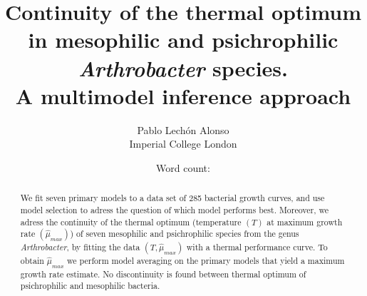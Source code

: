 \documentclass[titlepage,11pt]{article}
\newcommand{\wordcount}{} %
\begin{document}
	\title{\textbf{Continuity of the thermal optimum in mesophilic and psichrophilic \textit{Arthrobacter} species.\\
		 A multimodel inference approach} }
	\author{Pablo Lechón Alonso \\ [30pt]
				Imperial College London}
	\date{Word count: \wordcount}%
	\maketitle
	

	\begin{abstract}
		We fit seven primary models to a data set of 285 bacterial growth curves, and use model selection to adress the question of which model performs best. Moreover, we adress the continuity of the thermal optimum (temperature $ (T) $ at maximum growth rate $ (\hat{\mu}_{max} )$) of seven mesophilic and psichrophilic species from the genus \textit{Arthrobacter}, by fitting the data $ (T, \hat{\mu}_{max}) $ with a thermal performance curve. To obtain $\hat{\mu}_{max}$ we perform model averaging on the primary models that yield a maximum growth rate estimate. No discontinuity is found between thermal optimum of psichrophilic and mesophilic bacteria. 
	\end{abstract}

	\tableofcontents
	\newpage
	
\end{document}
